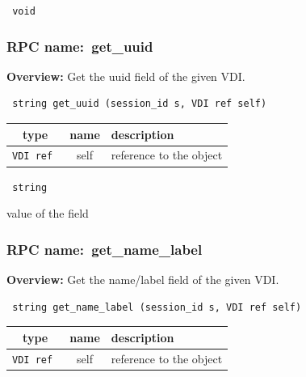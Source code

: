 \vspace{0.3cm}

{\tt 
void
}



\vspace{0.3cm}
\vspace{0.3cm}
\vspace{0.3cm}
\subsubsection{RPC name:~get\_uuid}

{\bf Overview:} 
Get the uuid field of the given VDI.

\begin{verbatim} string get_uuid (session_id s, VDI ref self)\end{verbatim}



 
\vspace{0.3cm}
\begin{tabular}{|c|c|p{7cm}|}
 \hline
{\bf type} & {\bf name} & {\bf description} \\ \hline
{\tt VDI ref } & self & reference to the object \\ \hline 

\end{tabular}

\vspace{0.3cm}

{\tt 
string
}


value of the field
\vspace{0.3cm}
\vspace{0.3cm}
\vspace{0.3cm}
\subsubsection{RPC name:~get\_name\_label}

{\bf Overview:} 
Get the name/label field of the given VDI.

\begin{verbatim} string get_name_label (session_id s, VDI ref self)\end{verbatim}



 
\vspace{0.3cm}
\begin{tabular}{|c|c|p{7cm}|}
 \hline
{\bf type} & {\bf name} & {\bf description} \\ \hline
{\tt VDI ref } & self & reference to the object \\ \hline 

\end{tabular}

